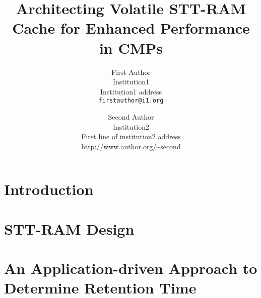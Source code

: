 \documentclass[12pt,letterpaper]{article}
\begin{document}
\title{Architecting Volatile STT-RAM Cache for Enhanced Performance in
CMPs}

\author{First Author\\
Institution1\\
Institution1 address\\
{\tt\small firstauthor@i1.org}
\and
Second Author\\
Institution2\\
First line of institution2 address\\
{\small\url{http://www.author.org/~second}}
}

\maketitle

\begin{abstract}

\end{abstract}
\section{Introduction} \label{sec:intro}

\section{STT-RAM Design} \label{sec:design}

\vspace{-2mm}
\section{An Application-driven Approach to Determine Retention Time} \label{sec:motivation}

\end{document}

